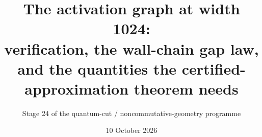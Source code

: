 \documentclass[11pt]{amsart}
\title[The activation graph at width 1024]{The activation graph at width 1024:\\ verification, the wall-chain gap law,\\ and the quantities the certified-approximation theorem needs}
\author{Stage 24 of the quantum-cut / noncommutative-geometry programme}
\date{10 October 2026}
\theoremstyle{definition}
\theoremstyle{remark}
\begin{document}
\sloppy


\end{document}
